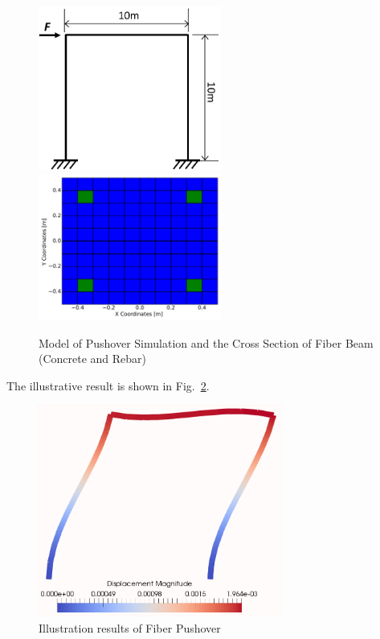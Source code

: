 \begin{figure}[H]
  \centering
  \includegraphics[width = 6cm]{./Figure-files/Day1/Pushover_for_Nonlinear_Frame/overview.pdf}
  \includegraphics[width = 6cm]{./Figure-files/Day1/Pushover_for_Nonlinear_Frame/rectangle_rebar2.pdf}
  \caption{Model of Pushover Simulation and the Cross Section of Fiber Beam (Concrete and Rebar) }
  \label{fig_single_element_pushover}
\end{figure}

The illustrative result is shown in Fig.~\ref{fig_day1_fiberbeam_pushover_results}.
\begin{figure}[H]
  \centering
  \includegraphics[width = 8cm]{./Figure-files/Day1/Pushover_for_Nonlinear_Frame/fiberBeamDeform.png}
  \caption{Illustration results of Fiber Pushover}
  \label{fig_day1_fiberbeam_pushover_results}
\end{figure}


